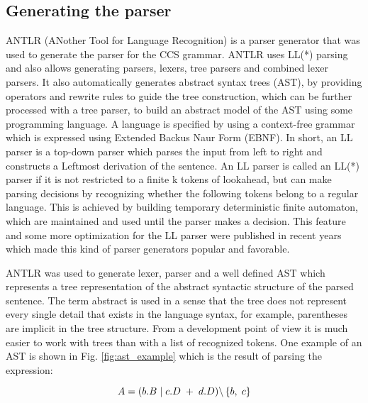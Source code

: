 \subsection{Generating the parser}
ANTLR (ANother Tool for Language Recognition) \cite{ANTLRRef} is a parser generator that was used 
to generate the parser for the CCS grammar. ANTLR uses LL(*) parsing and also allows generating 
parsers, lexers, tree parsers and combined lexer parsers. It also automatically generates 
abstract syntax trees (AST), by providing operators and rewrite rules to guide the tree construction,
which can be further processed with a tree parser, to build an abstract model of the AST using some programming language.
A language is specified by using a context-free
grammar which is expressed using Extended Backus Naur Form (EBNF). In short, an LL parser is a 
top-down parser which parses the input from left to right and constructs a Leftmost derivation 
of the sentence. An LL parser is called an LL(*) parser if it is not restricted to a finite k 
tokens of lookahead, but can make parsing decisions by recognizing whether the following tokens
belong to a regular language. This is achieved by building temporary deterministic finite
automaton, which are maintained and used until the parser makes a decision. This feature and
some more optimization for the LL parser were published in recent years which made this kind 
of parser generators popular and favorable.

ANTLR was used to generate lexer, parser and a well defined AST which represents a tree representation 
of the abstract syntactic structure of the parsed sentence. The term abstract is used in a sense 
that the tree does not represent every single detail that exists in the language syntax, 
for example, parentheses are implicit in the tree structure. 
From a development point of view it is much easier to work with trees than with a list of recognized
tokens. One example of an AST is shown in  Fig. \ref{fig:ast_example} which is the result of parsing the expression: 

\begin{equation}\label{eq:ccs_example}
 A=( b.B \hspace{1 mm} | \hspace{1 mm} c.D \hspace{1 mm} + \hspace{1 mm} d.D )
\backslash \left\lbrace b, \hspace{1 mm} c \right\rbrace 
\end{equation}

